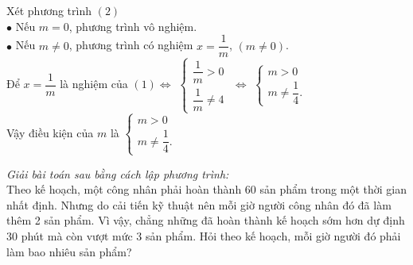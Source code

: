 \begin{ex}
{\begin{enumerate}
        Xét phương trình $(2)$\\
        $\bullet$ Nếu $m=0$, phương trình vô nghiệm.\\
        $\bullet$ Nếu $m\neq 0$, phương trình có nghiệm $x=\dfrac{1}{m}$, $(m\neq 0)$.\\ 
        Để $x=\dfrac{1}{m}$ là nghiệm của $(1) \Leftrightarrow$
        $\begin{cases}
            \dfrac{1}{m} >0\\
           \dfrac{1}{m}\neq 4
        \end{cases}$
        $\Leftrightarrow$ 
         $\begin{cases}
            m >0\\
          m\neq \dfrac{1}{4}.
        \end{cases}$
	\\
        Vậy điều kiện của $m$ là  
        $\begin{cases}
            m >0\\
          m\neq \dfrac{1}{4}.
        \end{cases}$
\end{enumerate}
            }

\end{ex} 
 
\begin{ex}%
 \textit{Giải bài toán sau bằng cách lập phương trình:}\\
	     Theo kế hoạch, một công nhân phải hoàn thành 60 sản phẩm trong một thời gian nhất định. Nhưng do cải tiến kỹ thuật nên mỗi giờ người công nhân đó đã làm thêm 2 sản phẩm. Vì vậy, chẳng những đã hoàn thành kế hoạch sớm hơn dự định 30 phút mà còn vượt mức 3 sản phẩm. Hỏi theo kế hoạch, mỗi giờ người đó phải làm bao nhiêu sản phẩm?
\end{ex}  


